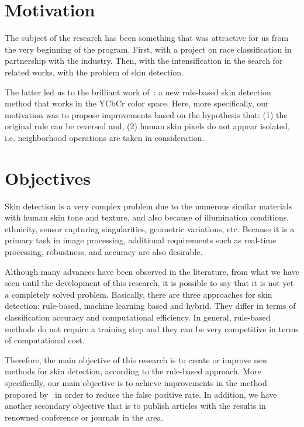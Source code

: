 \section{Motivation}
\label{sec:motivation}

The subject of the research has been something that was attractive for us from the very beginning of the program. First, with a project on race classification in partnership with the industry. Then, with the intensification in the search for related works, with the problem of skin detection.

The latter led us to the brilliant work of~\citet{brancati:17}: a new rule-based skin detection method that works in the YCbCr color space. Here, more specifically, our motivation was to propose improvements based on the hypothesis that: (1) the original rule can be reversed and, (2) human skin pixels do not appear isolated, i.e. neighborhood operations are taken in consideration.


\section{Objectives}
\label{sec:objectives}

Skin detection is a very complex problem due to the numerous similar materials with human skin tone and texture, and also because of illumination conditions, ethnicity, sensor capturing singularities, geometric variations, etc. Because it is a primary task in image processing, additional requirements such as real-time processing, robustness, and accuracy are also desirable.

Although many advances have been observed in the literature, from what we have seen until the development of this research, it is possible to say that it is not yet a completely solved problem. Basically, there are three approaches for skin detection: rule-based, machine learning based and hybrid. They differ in terms of classification accuracy and computational efficiency. In general, rule-based methods do not require a training step and they can be very competitive in terms of computational cost.

Therefore, the main objective of this research is to create or improve new methods for skin detection, according to the rule-based approach. More specifically, our main objective is to achieve improvements in the method proposed by~\citet{brancati:17} in order to reduce the false positive rate. In addition, we have another secondary objective that is to publish articles with the results in renowned conference or journals in the area.


